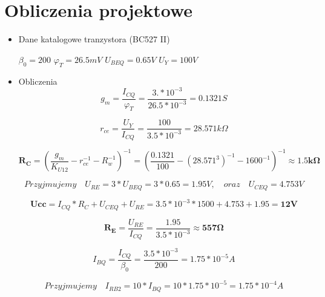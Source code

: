 \documentclass[a4paper,12pt]{article}
\begin{document}
\section{Obliczenia projektowe}
\begin{itemize}
 \item Dane katalogowe tranzystora (BC527 II)

 $\beta_0  = 200 $\newline
 $\varphi_T = 26.5mV$ \newline
 $U_{BEQ}=0.65V$ \newline
 $U_Y = 100V$
 
 \item Obliczenia
\begin{equation}
g_m = \frac{I_{CQ}}{\varphi_T} = \frac{3.*10^{-3}}{26.5*10^{-3}} = 0.1321S
\end{equation}

\begin{equation}
r_{ce} = \frac{U_Y}{I_{CQ}} = \frac{100}{3.5*10^{-3}} = 28.571k\Omega
\end{equation}

\begin{equation}
\mathbf{R_C} = (\frac{g_m}{K_{U12}} - r_{ce}^{-1} - R_w^{-1})^{-1} = (\frac{0.1321}{100} - (28.571^3)^{-1} - 1600^{-1})^{-1} \approx \mathbf{1.5 k\Omega}
\end{equation}

\begin{equation}
Przyjmujemy \quad U_{RE} = 3*U_{BEQ} = 3*0.65 = 1.95V, \quad oraz \quad U_{CEQ} = 4.753V
\end{equation}

\begin{equation}
\mathbf{Ucc} = I_{CQ}*R_C + U_{CEQ} + U_{RE} = 3.5*10^{-3}*1500 + 4.753 + 1.95 = \mathbf{12V}
\end{equation}

\begin{equation}
\mathbf{R_E} = \frac{U_{RE}}{I_{CQ}} = \frac{1.95}{3.5*10^{-3}} \approx \mathbf{557\Omega}
\end{equation}

\begin{equation}
I_{BQ} = \frac{I_{CQ}}{\beta_0} = \frac{3.5*10^{-3}}{200} = 1.75*10^{-5}A
\end{equation}

\begin{equation}
Przyjmujemy \quad I_{RB2} = 10*I_{BQ} = 10 * 1.75*10^{-5} = 1.75*10^{-4}A
\end{equation}


\end{itemize}
\end{document}
